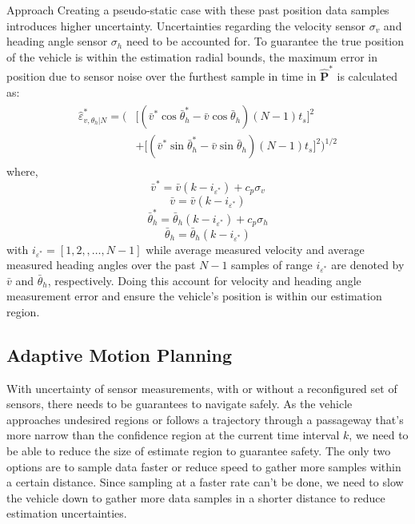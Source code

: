 \begin{section}{Approach}
Creating a pseudo-static case with these past position data samples introduces higher uncertainty. Uncertainties regarding the velocity sensor $\sigma_v$ and heading angle sensor $\sigma_h$ need to be accounted for. To guarantee the true position of the vehicle is within the estimation radial bounds, the maximum error in position due to sensor noise over the furthest sample in time in $\hat{\bm{P}}^*$ is calculated as:
    \begin{align}
    \begin{split}
	\hat{\varepsilon}_{v,\theta_h|N}^{*}=\Big( &\big[(\bar{v}^* \cos{\bar{\theta}_h^*} - \bar{v}\cos{\bar{\theta}_h})(N-1)t_s \big]^2 \\
	&+ \big[ (\bar{v}^* \sin{\bar{\theta}_h^*} - \bar{v}\sin{\bar{\theta}_h})(N-1)t_s \big]^2 \Big) ^{1/2}
	\end{split}
	\end{align}
where,
    \begin{equation}
	\bar{v}^{*}=\bar{v}(k-i_{\varepsilon^{*}})+c_p\sigma_v \nonumber
	\end{equation}
    \begin{equation}
	\bar{v}=\bar{v}(k-i_{\varepsilon^{*}}) \nonumber
	\end{equation}
	\begin{equation}
	\bar{\theta}_h^{*}=\bar{\theta}_h(k-i_{\varepsilon^{*}})+c_p\sigma_h \nonumber
	\end{equation}
	\begin{equation}
	\bar{\theta}_h=\bar{\theta}_h(k-i_{\varepsilon^{*}}) \nonumber
	\end{equation}
with $i_{\varepsilon^{*}}=[1,2,,\dots,N-1]$ while average measured velocity and average measured heading angles over the past $N-1$ samples of range $i_{\varepsilon^{*}}$ are denoted by $\bar{v}$ and $\bar{\theta}_h$, respectively. Doing this account for velocity and heading angle measurement error and ensure the vehicle's position is within our estimation region.


\subsection{Adaptive Motion Planning}



With uncertainty of sensor measurements, with or without a reconfigured set of sensors, there needs to be guarantees to navigate safely. As the vehicle approaches undesired regions or follows a trajectory through a passageway that's more narrow than the confidence region at the current time interval $k$, we need to be able to reduce the size of estimate region to guarantee safety. The only two options are to sample data faster or reduce speed to gather more samples within a certain distance. Since sampling at a faster rate can't be done, we need to slow the vehicle down to gather more data samples in a shorter distance to reduce estimation uncertainties.


\end{section}
